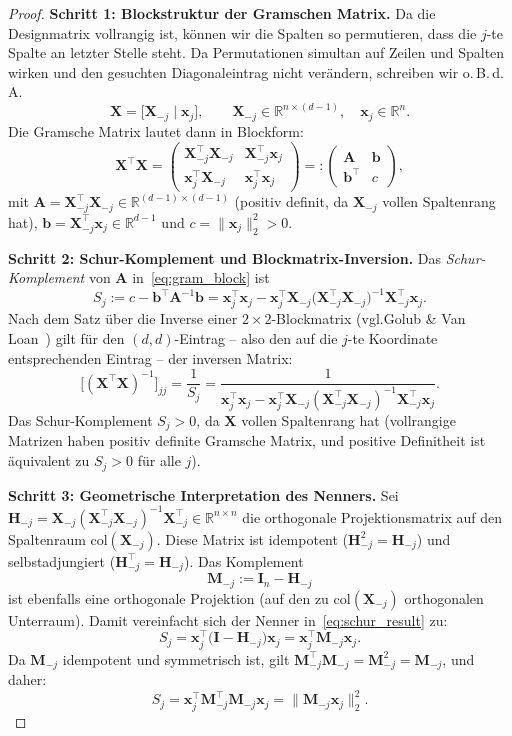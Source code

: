 ﻿\documentclass[12pt, a4paper]{article}
\theoremstyle{definition}
\theoremstyle{remark}
\newcommand{\R}{\mathbb{R}}
\newcommand{\vx}{\bm{x}}
\newcommand{\vX}{\bm{X}}
\newcommand{\T}{\top}
\begin{document}
\begin{proof}
	\textbf{Schritt 1: Blockstruktur der Gramschen Matrix.}
	Da die Designmatrix vollrangig ist, können wir die Spalten so permutieren, dass die
	$j$-te Spalte an letzter Stelle steht. Da Permutationen simultan auf Zeilen und Spalten
	wirken und den gesuchten Diagonaleintrag nicht verändern, schreiben wir o.\,B.\,d.\,A.
	\[
	\vX = \bigl[\vX_{-j} \;\big|\; \vx_j\bigr], \qquad \vX_{-j} \in \R^{n \times (d-1)},\quad \vx_j \in \R^n.
	\]
	Die Gramsche Matrix lautet dann in Blockform:
	\begin{equation}
		\vX^\T\vX
		= \begin{pmatrix} \vX_{-j}^\T\vX_{-j} & \vX_{-j}^\T\vx_j \\[4pt]
			\vx_j^\T\vX_{-j} & \vx_j^\T\vx_j \end{pmatrix}
		=: \begin{pmatrix} \bm{A} & \bm{b} \\ \bm{b}^\T & c \end{pmatrix},
		\label{eq:gram_block}
	\end{equation}
	mit $\bm{A} = \vX_{-j}^\T\vX_{-j} \in \R^{(d-1)\times(d-1)}$ (positiv definit, da $\vX_{-j}$
	vollen Spaltenrang hat), $\bm{b} = \vX_{-j}^\T\vx_j \in \R^{d-1}$ und
	$c = \|\vx_j\|_2^2 > 0$.

	\textbf{Schritt 2: Schur-Komplement und Blockmatrix-Inversion.}
	Das \emph{Schur-Komplement} von $\bm{A}$ in~\eqref{eq:gram_block} ist
	\[
	S_j := c - \bm{b}^\T\bm{A}^{-1}\bm{b}
	= \vx_j^\T\vx_j - \vx_j^\T\vX_{-j}\bigl(\vX_{-j}^\T\vX_{-j}\bigr)^{-1}\vX_{-j}^\T\vx_j.
	\]
	Nach dem Satz über die Inverse einer $2\times2$-Blockmatrix (vgl.\@ Golub \& Van
	Loan~\cite{golub2013matrix}) gilt für den $(d,d)$-Eintrag -- also den auf die $j$-te
	Koordinate entsprechenden Eintrag -- der inversen Matrix:
	\begin{equation}
		\bigl[(\vX^\T\vX)^{-1}\bigr]_{jj} = \frac{1}{S_j}
		= \frac{1}{\vx_j^\T\vx_j - \vx_j^\T\vX_{-j}(\vX_{-j}^\T\vX_{-j})^{-1}\vX_{-j}^\T\vx_j}.
		\label{eq:schur_result}
	\end{equation}
	Das Schur-Komplement $S_j > 0$, da $\vX$ vollen Spaltenrang hat (vollrangige Matrizen
	haben positiv definite Gramsche Matrix, und positive Definitheit ist äquivalent zu
	$S_j > 0$ für alle $j$).

	\textbf{Schritt 3: Geometrische Interpretation des Nenners.}
	Sei $\bm{H}_{-j} = \vX_{-j}(\vX_{-j}^\T\vX_{-j})^{-1}\vX_{-j}^\T \in \R^{n\times n}$ die
	orthogonale Projektionsmatrix auf den Spaltenraum $\mathrm{col}(\vX_{-j})$. Diese Matrix
	ist idempotent ($\bm{H}_{-j}^2 = \bm{H}_{-j}$) und selbstadjungiert ($\bm{H}_{-j}^\T = \bm{H}_{-j}$).
	Das Komplement
	\[
	\bm{M}_{-j} := \bm{I}_n - \bm{H}_{-j}
	\]
	ist ebenfalls eine orthogonale Projektion (auf den zu $\mathrm{col}(\vX_{-j})$ orthogonalen
	Unterraum). Damit vereinfacht sich der Nenner in~\eqref{eq:schur_result} zu:
	\[
	S_j = \vx_j^\T\bigl(\bm{I} - \bm{H}_{-j}\bigr)\vx_j = \vx_j^\T\bm{M}_{-j}\vx_j.
	\]
	Da $\bm{M}_{-j}$ idempotent und symmetrisch ist, gilt $\bm{M}_{-j}^\T\bm{M}_{-j} = \bm{M}_{-j}^2 = \bm{M}_{-j}$,
	und daher:
	\[
	S_j = \vx_j^\T\bm{M}_{-j}^\T\bm{M}_{-j}\vx_j = \|\bm{M}_{-j}\vx_j\|_2^2.
	\]


\end{proof}
\end{document}
